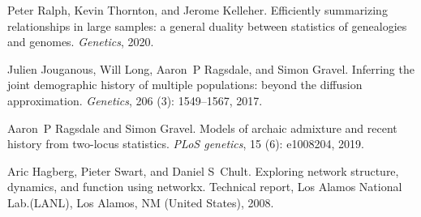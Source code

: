 \documentclass{article}
\begin{document}
\begin{thebibliography}{18}
Peter Ralph, Kevin Thornton, and Jerome Kelleher.
\newblock Efficiently summarizing relationships in large samples: a general
  duality between statistics of genealogies and genomes.
\newblock \emph{Genetics}, 2020.

Julien Jouganous, Will Long, Aaron~P Ragsdale, and Simon Gravel.
\newblock Inferring the joint demographic history of multiple populations:
  beyond the diffusion approximation.
\newblock \emph{Genetics}, 206 (3): 1549--1567, 2017.

Aaron~P Ragsdale and Simon Gravel.
\newblock Models of archaic admixture and recent history from two-locus
  statistics.
\newblock \emph{PLoS genetics}, 15 (6): e1008204, 2019.

Aric Hagberg, Pieter Swart, and Daniel S~Chult.
\newblock Exploring network structure, dynamics, and function using networkx.
\newblock Technical report, Los Alamos National Lab.(LANL), Los Alamos, NM
  (United States), 2008.

\end{thebibliography}


\pagebreak
\end{document}
